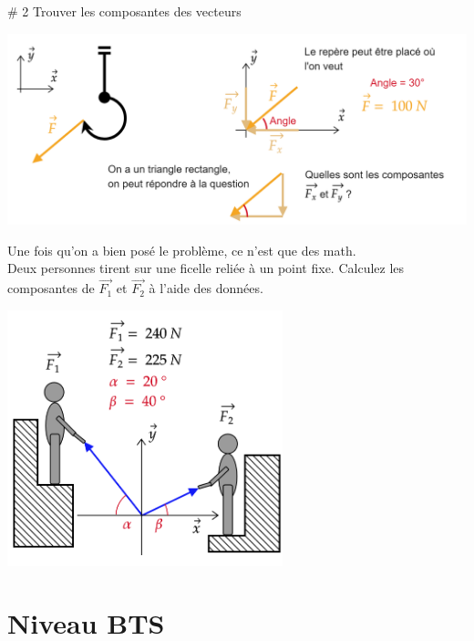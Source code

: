 \documentclass[12pt]{article}
\begin{document}
\begin{problem}{\# 2 Trouver les composantes des vecteurs}

        \begin{center}
            \includegraphics[width=1\textwidth]{DD11.png}
        \end{center}
    
    
Une fois qu'on a bien posé le problème, ce n'est que des math. \\

Deux personnes tirent sur une ficelle reliée à un point fixe. Calculez les composantes de $\Vec{F_1}$ et $\Vec{F_2}$ à l'aide des données.

        \begin{center}
            \includegraphics[width=0.6\textwidth]{DD12.png}
        \end{center}


\end{problem}



\section{Niveau BTS}
\end{document}
